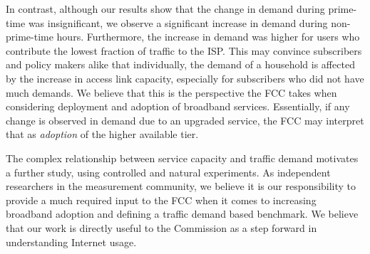 In contrast, although our results show that the change in demand during 
prime-time was insignificant, we observe a significant increase in demand 
during non-prime-time hours. Furthermore, the increase in demand was higher for 
users who contribute the lowest fraction of traffic to the ISP. This may 
convince subscribers and policy makers alike that individually, the demand of a 
household is affected by the increase in access link capacity, especially for 
subscribers who did not have much demands. We believe that this is the 
perspective the FCC takes when considering deployment and adoption of 
broadband services. Essentially, if any change is observed in demand due to an 
upgraded service, the FCC may interpret that as \emph{adoption} of the higher 
available tier.

The complex relationship between service capacity and traffic demand motivates 
a further study, using controlled and natural experiments. As independent 
researchers in the measurement community, we believe it is our responsibility 
to 
provide a much required input to the FCC when it comes to increasing broadband 
adoption and defining a traffic demand based benchmark. We believe that our work 
is
directly useful to the Commission as a step forward in understanding Internet 
usage.